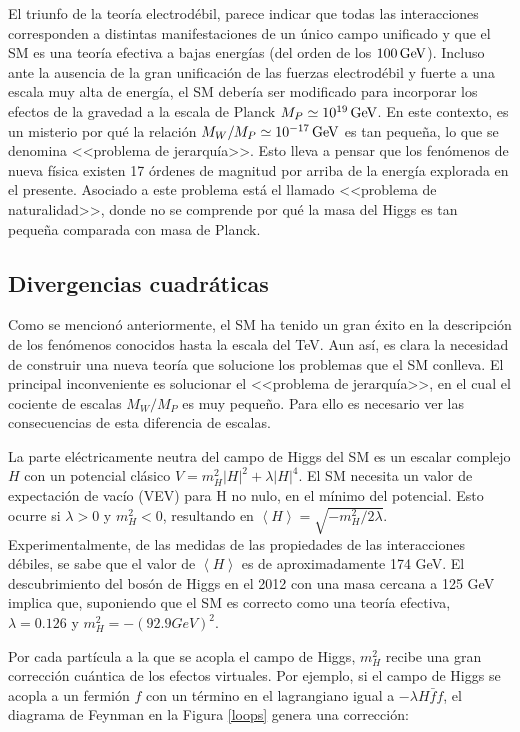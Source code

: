 El triunfo de la teoría electrodébil, parece indicar que todas las interacciones corresponden a distintas manifestaciones de un único campo unificado y que el SM es una teoría efectiva a bajas energías (del orden de los $100\, \mathrm{GeV}$). Incluso ante la ausencia de la gran unificación de las fuerzas electrodébil y fuerte a una escala muy alta de energía, el SM debería ser modificado para incorporar los efectos de la gravedad a la escala de Planck $M_{P} \simeq 10^{19} \, \mathrm{GeV}$. En este contexto, es un misterio por qué la relación $M_{W}/M_{P} \simeq 10^{-17} \, \mathrm{GeV}$ es tan pequeña, lo que se denomina <<problema de jerarquía>>\cite{PhysRevD.14.1667}. Esto lleva a pensar que los fenómenos de nueva física existen 17 órdenes de magnitud por arriba de la energía explorada en el presente. Asociado a este problema está el llamado <<problema de naturalidad>>, donde no se comprende por qué la masa del Higgs es tan pequeña comparada con masa de Planck.


\subsection{Divergencias cuadráticas}

Como se mencionó anteriormente, el SM ha tenido un gran éxito en la descripción de los fenómenos conocidos hasta la escala del TeV. Aun así, es clara la necesidad de construir una nueva teoría que solucione los problemas que el SM conlleva. El principal inconveniente es solucionar el <<problema de jerarquía>>, en el cual el cociente de escalas $M_{W}/M_{P}$ es muy pequeño. Para ello es necesario ver las consecuencias de esta diferencia de escalas.

La parte eléctricamente neutra del campo de Higgs del SM es un escalar complejo $H$ con un potencial clásico $V=m_{H}^{2}|H|^{2}+\lambda|H|^{4}$. El SM necesita un valor de expectación de vacío (VEV) para H no nulo, en el mínimo del potencial. Esto ocurre si $\lambda >0$ y $m_{H}^{2}<0$, resultando en $\left\langle H \right\rangle = \sqrt{-m_{H}^{2}/2\lambda}$. Experimentalmente, de las medidas de las propiedades de las interacciones débiles, se sabe que el valor de $\left\langle H \right\rangle$ es de aproximadamente 174 GeV. El descubrimiento del bosón de Higgs en el 2012 con una masa cercana a 125 GeV implica que, suponiendo que el SM es correcto como una teoría efectiva, $\lambda = 0.126$ y $m_{H}^{2}=-(92.9 GeV)^{2}$.

Por cada partícula a la que se acopla el campo de Higgs, $m_{H}^{2}$ recibe una gran corrección cuántica de los efectos virtuales. Por ejemplo, si el campo de Higgs se acopla a un fermión $f$ con un término en el lagrangiano igual a $-\lambda H\bar{f}f$, el diagrama de Feynman en la Figura \ref{loops} genera una corrección:

